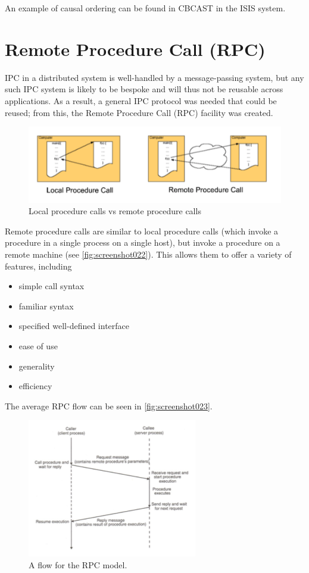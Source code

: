 An example of causal ordering can be found in CBCAST in the ISIS system.

\section{Remote Procedure Call (RPC)}
IPC in a distributed system is well-handled by a message-passing system, but any such IPC system is likely to be bespoke and will thus not be reusable across applications. As a result, a general IPC protocol was needed that could be reused; from this, the Remote Procedure Call (RPC) facility was created.

\begin{figure}
\centering
\includegraphics[width=0.7\linewidth]{screenshot022}
\caption{Local procedure calls vs remote procedure calls}
\label{fig:screenshot022}
\end{figure}

Remote procedure calls are similar to local procedure calls (which invoke a procedure in a single process on a single host), but invoke a procedure on a remote machine (see \autoref{fig:screenshot022}). This allows them to offer a variety of features, including \begin{itemize}
\item simple call syntax
\item familiar syntax
\item specified well-defined interface
\item ease of use
\item generality
\item efficiency
\end{itemize}

The average RPC flow can be seen in \autoref{fig:screenshot023}.
\begin{figure}
\centering
\includegraphics[width=0.7\linewidth]{screenshot023}
\caption{A flow for the RPC model.}
\label{fig:screenshot023}
\end{figure}

